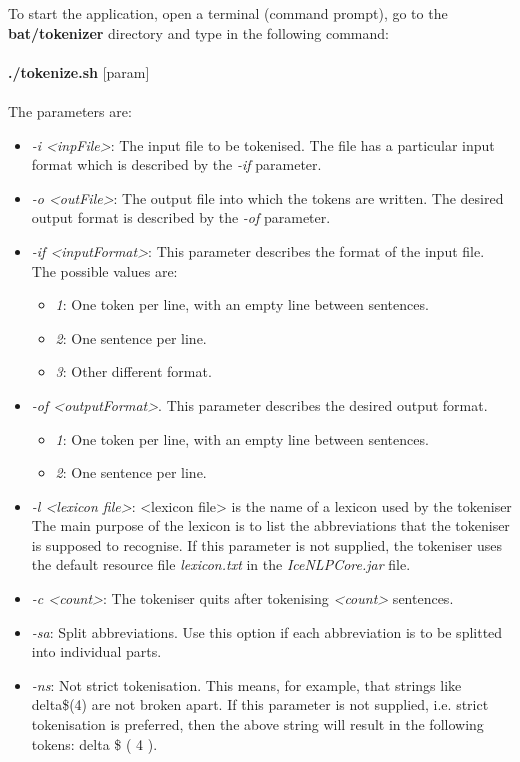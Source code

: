\documentclass[11pt]{article}
\begin{document}
To start the application, open a terminal (command prompt), go to the \textbf{bat/tokenizer} directory and type in the following command:\\ \\
{\bf ./tokenize.sh} [param] \\ \\
The parameters are:
\begin{itemize}
\item \emph{-i <inpFile>}: The input file to be tokenised. The file has a particular input format which is described by the \emph{-if} parameter.
\item \emph{-o <outFile>}: The output file into which the tokens are written. The desired output format is described by the \emph{-of} parameter.
\item \emph{-if <inputFormat>}: This parameter describes the format of the input file.
The possible values are:
\begin{itemize}
\item \emph{1}: One token per line, with an empty line between sentences.
\item \emph{2}: One sentence per line.
\item \emph{3}: Other different format.
\end{itemize}
\item \emph{-of <outputFormat>}. This parameter describes the desired output format.
\begin{itemize}
\item \emph{1}: One token per line, with an empty line between sentences.
\item \emph{2}: One sentence per line.
\end{itemize}
\item \emph{-l <lexicon file>}: <lexicon file> is the name of a lexicon used by the tokeniser 
The main purpose of the lexicon is to list the abbreviations that the tokeniser is supposed to recognise.
If this parameter is not supplied, the tokeniser uses the default resource file \emph{lexicon.txt} in the \emph{IceNLPCore.jar} file.
\item \emph{-c <count>}: The tokeniser quits after tokenising \emph{<count>} sentences.
\item \emph{-sa}: Split abbreviations. Use this option if each abbreviation is to be splitted into individual parts.
\item \emph{-ns}: Not strict tokenisation. This means, for example, that strings like delta\$(4) are not broken apart. If this parameter is not supplied, i.e. strict tokenisation is preferred, then the above string will result in the following tokens: delta \$ ( 4 ).
\end{itemize}
\end{document}
